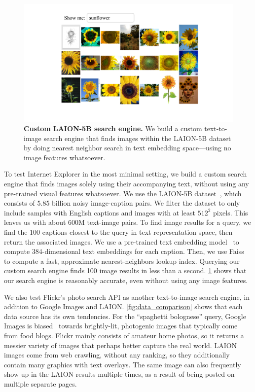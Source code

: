 \begin{figure}
\centering
    \vspace{-2em}
    \includegraphics[width=\linewidth]{figures/laion_search_engine.pdf}
    \vspace{-1em}
    \caption{\textbf{Custom LAION-5B search engine.} We build a custom text-to-image search engine that finds images within the LAION-5B dataset by doing nearest neighbor search in text embedding space---using no image features whatsoever.}
    \label{fig:laion_search_engine}
    \vspace{-4em}
\end{figure}

To test Internet Explorer in the most minimal setting, we build a custom search engine that finds images solely using their accompanying text, without using any pre-trained visual features whatsoever. We use the LAION-5B dataset~\cite{schuhmann2022laion}, which consists of 5.85 billion noisy image-caption pairs. We filter the dataset to only include samples with English captions and images with at least $512^2$ pixels. This leaves us with about 600M text-image pairs. To find image results for a query, we find the 100 captions closest to the query in text representation space, then return the associated images.
We use a pre-trained text embedding model~\cite{reimers2019sentence} to compute 384-dimensional text embeddings for each caption. Then, we use Faiss~\cite{johnson2019billion} to compute a fast, approximate nearest-neighbors lookup index. Querying our custom search engine finds 100 image results in less than a second. \cref{fig:laion_search_engine} shows that our search engine is reasonably accurate, even without using any image features. 

We also test Flickr's photo search API as another text-to-image search engine, in addition to Google Images and LAION. \cref{fig:data_comparison} shows that each data source has its own tendencies. For the ``spaghetti bolognese'' query, Google Images is biased~\cite{mezuman2012learning,chen2015webly} towards brightly-lit, photogenic images that typically come from food blogs. Flickr mainly consists of amateur home photos, so it returns a messier variety of images that perhaps better capture the real world. LAION images come from web crawling, without any ranking, so they additionally contain many graphics with text overlays. The same image can also frequently show up in the LAION results multiple times, as a result of being posted on multiple separate pages. 



